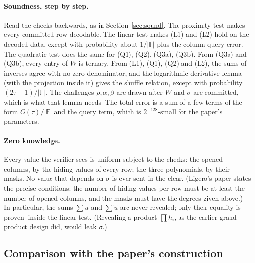 \documentclass[11pt,a4paper]{article}
\newcommand{\F}{\mathbb{F}}
\newcommand{\uh}{\hat{u}}
\theoremstyle{definition}
\theoremstyle{plain}
\begin{document}
\paragraph{Soundness, step by step.} Read the checks backwards, as in Section~\ref{sec:sound}.
The proximity test makes every committed row decodable. The linear test makes (L1) and (L2) hold on
the decoded data, except with probability about $1/|\F|$ plus the column-query error. The quadratic
test does the same for (Q1), (Q2), (Q3a), (Q3b). From (Q3a) and (Q3b), every entry of $W$ is
ternary. From (L1), (Q1), (Q2) and (L2), the sums of inverses agree with no zero denominator, and
the logarithmic-derivative lemma (with the projection inside it) gives the shuffle relation, except
with probability $(2\tau-1)/|\F|$. The challenges $\rho,\alpha,\beta$ are drawn after $W$ and $\sigma$
are committed, which is what that lemma needs. The total error is a sum of a few terms of the form
$O(\tau)/|\F|$ and the query term, which is $2^{-128}$-small for the paper's parameters.

\paragraph{Zero knowledge.} Every value the verifier sees is uniform subject to the checks: the
opened columns, by the hiding values of every row; the three polynomials, by their masks. No value
that depends on $\sigma$ is ever sent in the clear. (Ligero's paper states the precise conditions:
the number of hiding values per row must be at least the number of opened columns, and the masks
must have the degrees given above.) In particular, the sums $\sum u$ and $\sum\uh$
are never revealed; only their equality is proven, inside the linear test. (Revealing a product
$\prod h_i$, as the earlier grand-product design did, would leak $\sigma$.)

\subsection{Comparison with the paper's construction}
\end{document}
